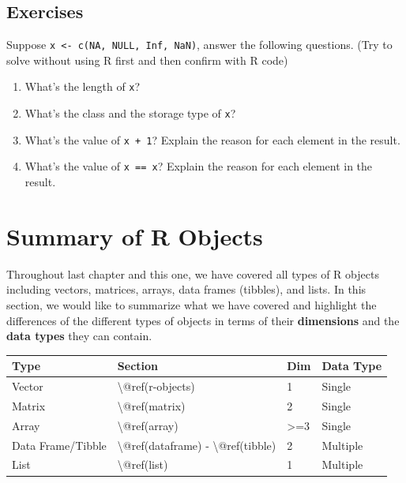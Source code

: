 \documentclass[
]{book}
\providecommand{\tightlist}{%
  \setlength{\itemsep}{0pt}\setlength{\parskip}{0pt}}
\begin{document}
\hypertarget{exercises-25}{%
\subsection{Exercises}\label{exercises-25}}

Suppose \texttt{x\ \textless{}-\ c(NA,\ NULL,\ Inf,\ NaN)}, answer the following questions. (Try to solve without using R first and then confirm with R code)

\begin{enumerate}
\def\labelenumi{\arabic{enumi}.}
\tightlist
\item
  What's the length of \texttt{x}?
\item
  What's the class and the storage type of \texttt{x}?
\item
  What's the value of \texttt{x\ +\ 1}? Explain the reason for each element in the result.
\item
  What's the value of \texttt{x\ ==\ x}? Explain the reason for each element in the result.
\end{enumerate}

\hypertarget{summary-r-objects}{%
\section{Summary of R Objects}\label{summary-r-objects}}

Throughout last chapter and this one, we have covered all types of R objects including vectors, matrices, arrays, data frames (tibbles), and lists. In this section, we would like to summarize what we have covered and highlight the differences of the different types of objects in terms of their \textbf{dimensions} and the \textbf{data types} they can contain.

\begin{tabular}{l|l|l|l}
\hline
Type & Section & Dim & Data Type\\
\hline
Vector & \textbackslash{}@ref(r-objects) & 1 & Single\\
\hline
Matrix & \textbackslash{}@ref(matrix) & 2 & Single\\
\hline
Array & \textbackslash{}@ref(array) & >=3 & Single\\
\hline
Data Frame/Tibble & \textbackslash{}@ref(dataframe) - \textbackslash{}@ref(tibble) & 2 & Multiple\\
\hline
List & \textbackslash{}@ref(list) & 1 & Multiple\\
\hline
\end{tabular}
\end{document}
